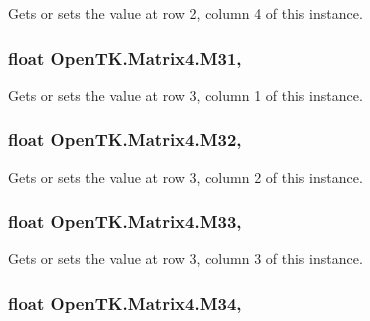 Gets or sets the value at row 2, column 4 of this instance. 

\hypertarget{struct_open_t_k_1_1_matrix4_ad246a5c283910c4c0d449bbda48ce9f4}{
\subsubsection[{M31}]{\setlength{\rightskip}{0pt plus 5cm}float Open\-T\-K.\-Matrix4.\-M31\hspace{0.3cm}{\ttfamily [get]}, {\ttfamily [set]}}}\label{struct_open_t_k_1_1_matrix4_ad246a5c283910c4c0d449bbda48ce9f4}


Gets or sets the value at row 3, column 1 of this instance. 

\hypertarget{struct_open_t_k_1_1_matrix4_af6e28741c160512d08a715bb26b704cf}{
\subsubsection[{M32}]{\setlength{\rightskip}{0pt plus 5cm}float Open\-T\-K.\-Matrix4.\-M32\hspace{0.3cm}{\ttfamily [get]}, {\ttfamily [set]}}}\label{struct_open_t_k_1_1_matrix4_af6e28741c160512d08a715bb26b704cf}


Gets or sets the value at row 3, column 2 of this instance. 

\hypertarget{struct_open_t_k_1_1_matrix4_a1ae9d90f8241dd5bc8223409256bf782}{
\subsubsection[{M33}]{\setlength{\rightskip}{0pt plus 5cm}float Open\-T\-K.\-Matrix4.\-M33\hspace{0.3cm}{\ttfamily [get]}, {\ttfamily [set]}}}\label{struct_open_t_k_1_1_matrix4_a1ae9d90f8241dd5bc8223409256bf782}


Gets or sets the value at row 3, column 3 of this instance. 

\hypertarget{struct_open_t_k_1_1_matrix4_a23fec879bedcd2af4439b5f6193be2df}{
\subsubsection[{M34}]{\setlength{\rightskip}{0pt plus 5cm}float Open\-T\-K.\-Matrix4.\-M34\hspace{0.3cm}{\ttfamily [get]}, {\ttfamily [set]}}}\label{struct_open_t_k_1_1_matrix4_a23fec879bedcd2af4439b5f6193be2df}


